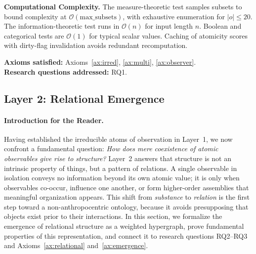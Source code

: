 \textbf{Computational Complexity.} The measure-theoretic test samples subsets to bound complexity at $\mathcal{O}(\text{max\_subsets})$, with exhaustive enumeration for $|o| \le 20$. The information-theoretic test runs in $\mathcal{O}(n)$ for input length $n$. Boolean and categorical tests are $\mathcal{O}(1)$ for typical scalar values. Caching of atomicity scores with dirty-flag invalidation avoids redundant recomputation.

\textbf{Axioms satisfied:} Axioms~\ref{ax:irred}, \ref{ax:multi}, \ref{ax:observer}. \\
\textbf{Research questions addressed:} RQ1.

\subsection{Layer 2: Relational Emergence}
\label{subsec:layer2}

\paragraph{Introduction for the Reader.}
Having established the irreducible atoms of observation in Layer~1, we now confront a fundamental question: \emph{How does mere coexistence of atomic observables give rise to structure?} Layer~2 answers that structure is not an intrinsic property of things, but a pattern of relations. A single observable in isolation conveys no information beyond its own atomic value; it is only when observables co-occur, influence one another, or form higher-order assemblies that meaningful organization appears. This shift from \emph{substance} to \emph{relation} is the first step toward a non-anthropocentric ontology, because it avoids presupposing that objects exist prior to their interactions. In this section, we formalize the emergence of relational structure as a weighted hypergraph, prove fundamental properties of this representation, and connect it to research questions RQ2--RQ3 and Axioms~\ref{ax:relational} and~\ref{ax:emergence}.

